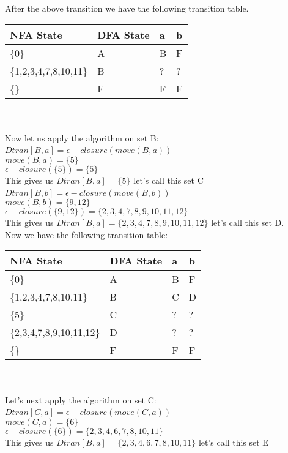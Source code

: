 \documentclass[11pt, a4paper]{article}
\begin{document}
		After the above transition we have the following transition table.\\
		\begin{tabular}{|l|l||l|l|}
			\hline
			NFA State & DFA State & a & b \\
			\hline
			\{0\} & A & B & F \\
			\hline
			\{1,2,3,4,7,8,10,11\} & B & ? & ?\\
			\hline
			\{\} & F & F & F \\
			\hline
		\end{tabular}~\\~\\
		Now let us apply the algorithm on set B: \\
		$Dtran[B,a] = \epsilon -closure(move(B,a))$~\\
		$move(B,a) = \{5\}$\\
		$\epsilon -closure(\{5\}) = \{5\}$\\ 
		This gives us $Dtran[B,a] = \{5\}$ let's call this set C\\
		$Dtran[B,b] = \epsilon -closure(move(B,b))$~\\
		$move(B,b) = \{9,12\}$\\
		$\epsilon -closure(\{9,12\}) = \{2,3,4,7,8,9,10,11,12\}$\\ 
		This gives us $Dtran[B,a] = \{2,3,4,7,8,9,10,11,12\}$ let's call this set D. \\
		Now we have the following transition table: \\
		\begin{tabular}{|l|l||l|l|}
			\hline
			NFA State & DFA State & a & b \\
			\hline
			\{0\} & A & B & F \\
			\hline
			\{1,2,3,4,7,8,10,11\} & B & C & D\\
			\hline
			\{5\} & C & ? & ? \\
			\hline
			\{2,3,4,7,8,9,10,11,12\} & D & ? & ? \\
			\hline
			\{\} & F & F & F \\
			\hline
		\end{tabular}~\\~\\
		Let's next apply the algorithm on set C: \\
		$Dtran[C,a] = \epsilon -closure(move(C,a))$~\\
		$move(C,a) = \{6\}$\\
		$\epsilon -closure(\{6\}) = \{2,3,4,6,7,8,10,11\}$\\ 
		This gives us $Dtran[B,a] = \{2,3,4,6,7,8,10,11\}$ let's call this set E\\
\end{document}
